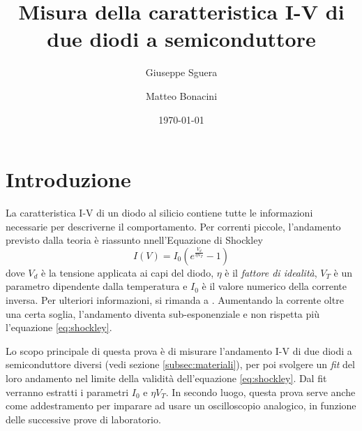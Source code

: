 \documentclass[11pt, a4paper, twocolumn]{article}
\author{Giuseppe Sguera \\ \getenv{MAT1} \and Matteo Bonacini \\ \getenv{MAT2}}
\date{\today}
\title{Misura della caratteristica I-V di due diodi a semiconduttore}
\begin{document}

\section{Introduzione}\label{sec:scopo}
  La caratteristica I-V di un diodo al silicio contiene tutte le informazioni necessarie per descriverne il comportamento.
  Per correnti piccole, l'andamento previsto dalla teoria è riassunto nnell'Equazione di Shockley
  \begin{equation}
    I(V) = I_0 \left(
      e^{
        \frac {V_d} {\eta V_T}
      } - 1
    \right)
    \label{eq:shockley}
  \end{equation}
  dove $V_d$ è la tensione applicata ai capi del diodo, $\eta$ è il \emph{fattore di idealità}, $V_T$ è un parametro dipendente dalla
  temperatura e $I_0$ è il valore numerico della corrente inversa. Per ulteriori informazioni, si rimanda a \cite{halkias2001integrated}.
  Aumentando la corrente oltre una certa soglia, l'andamento diventa sub-esponenziale e non rispetta più l'equazione \eqref{eq:shockley}.

  Lo scopo principale di questa prova è di misurare l'andamento I-V di due diodi a semiconduttore diversi (vedi sezione \ref{subsec:materiali}), per poi svolgere un
  \emph{fit} del loro andamento nel limite della validità dell'equazione \eqref{eq:shockley}. Dal fit verranno estratti i parametri $I_0$ e $\eta V_T$. 
  In secondo luogo, questa prova serve anche come addestramento per imparare ad usare un oscilloscopio analogico, in funzione delle successive
  prove di laboratorio.
\end{document}
